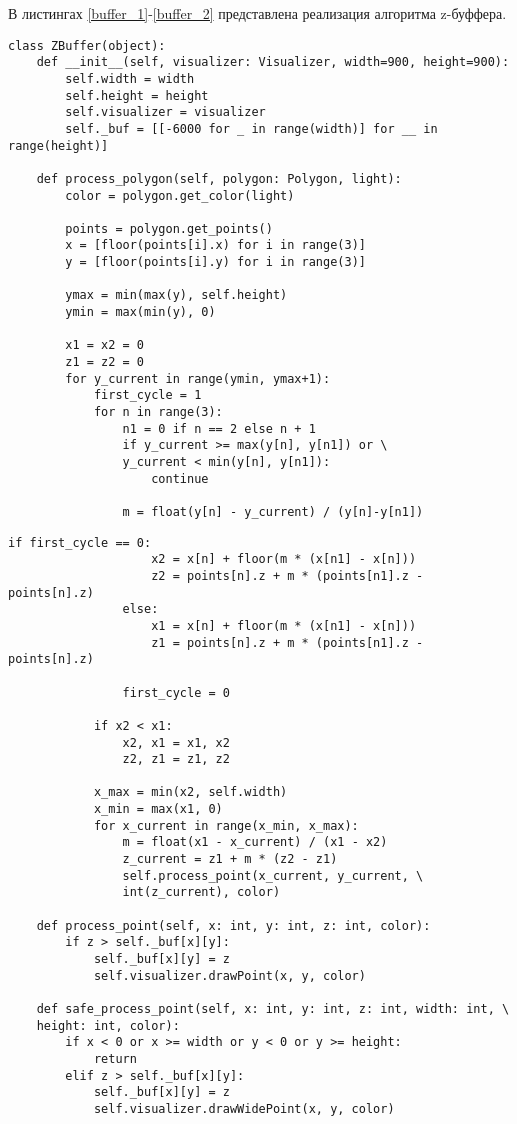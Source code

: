 В листингах \ref{buffer_1}-\ref{buffer_2} представлена реализация алгоритма z-буффера.

\begin{lstlisting}[label=buffer_1,caption=Алгоритм z-буффера(часть 1)]
class ZBuffer(object):
    def __init__(self, visualizer: Visualizer, width=900, height=900):
        self.width = width
        self.height = height
        self.visualizer = visualizer
        self._buf = [[-6000 for _ in range(width)] for __ in range(height)]

    def process_polygon(self, polygon: Polygon, light):
        color = polygon.get_color(light)

        points = polygon.get_points()
        x = [floor(points[i].x) for i in range(3)]
        y = [floor(points[i].y) for i in range(3)]

        ymax = min(max(y), self.height)
        ymin = max(min(y), 0)

        x1 = x2 = 0
        z1 = z2 = 0
        for y_current in range(ymin, ymax+1):
            first_cycle = 1
            for n in range(3):
                n1 = 0 if n == 2 else n + 1
                if y_current >= max(y[n], y[n1]) or \
                y_current < min(y[n], y[n1]):
                    continue

                m = float(y[n] - y_current) / (y[n]-y[n1])
\end{lstlisting}

\newpage

\begin{lstlisting}[label=buffer_2,caption=Алгоритм z-буффера(часть 2)]
                if first_cycle == 0:
                    x2 = x[n] + floor(m * (x[n1] - x[n]))
                    z2 = points[n].z + m * (points[n1].z - points[n].z)
                else:
                    x1 = x[n] + floor(m * (x[n1] - x[n]))
                    z1 = points[n].z + m * (points[n1].z - points[n].z)

                first_cycle = 0

            if x2 < x1:
                x2, x1 = x1, x2
                z2, z1 = z1, z2

            x_max = min(x2, self.width)
            x_min = max(x1, 0)
            for x_current in range(x_min, x_max):
                m = float(x1 - x_current) / (x1 - x2)
                z_current = z1 + m * (z2 - z1)
                self.process_point(x_current, y_current, \
                int(z_current), color)

    def process_point(self, x: int, y: int, z: int, color):
        if z > self._buf[x][y]:
            self._buf[x][y] = z
            self.visualizer.drawPoint(x, y, color)

    def safe_process_point(self, x: int, y: int, z: int, width: int, \
    height: int, color):
        if x < 0 or x >= width or y < 0 or y >= height:
            return
        elif z > self._buf[x][y]:
            self._buf[x][y] = z
            self.visualizer.drawWidePoint(x, y, color)
\end{lstlisting}

